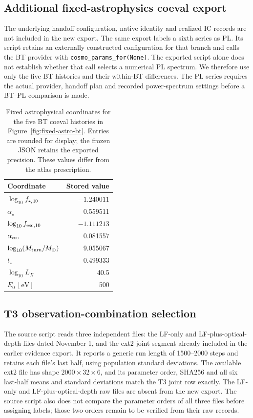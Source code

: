 \subsection{Additional fixed-astrophysics coeval export}\label{app:fixed-astro-update}

The underlying handoff configuration, native identity and realized IC records are not included in the new export. The same export labels a sixth series as PL. Its script retains an externally constructed configuration for that branch and calls the BT provider with \texttt{cosmo\_params\_for(None)}. The exported script alone does not establish whether that call selects a numerical PL spectrum. We therefore use only the five BT histories and their within-BT differences. The PL series requires the actual provider, handoff plan and recorded power-spectrum settings before a BT--PL comparison is made.

\begin{table}[t]\centering\small
\caption{Fixed astrophysical coordinates for the five BT coeval histories in Figure~\ref{fig:fixed-astro-bt}. Entries are rounded for display; the frozen JSON retains the exported precision. These values differ from the atlas prescription.}\label{tab:fixed-astro-update}
\begin{tabular}{lr}\toprule
Coordinate & Stored value\\\midrule
$\log_{10}f_{\star,10}$ & $-1.240011$\\
$\alpha_\star$ & 0.559511\\
$\log_{10}f_{{\rm esc},10}$ & $-1.111213$\\
$\alpha_{\rm esc}$ & 0.081557\\
$\log_{10}(M_{\rm turn}/M_\odot)$ & 9.055067\\
$t_\star$ & 0.499333\\
$\log_{10}L_X$ & 40.5\\
$E_0\ [\mathrm{eV}]$ & 500\\\bottomrule
\end{tabular}\end{table}

\subsection{T3 observation-combination selection}\label{app:t3-selection}

The source script reads three independent files: the LF-only and LF-plus-optical-depth files dated November 1, and the ext2 joint segment already included in the earlier evidence export. It reports a generic run length of 1500--2000 steps and retains each file's last half, using population standard deviations. The available ext2 file has shape $2000\times32\times6$, and its parameter order, SHA256 and all six last-half means and standard deviations match the T3 joint row exactly. The LF-only and LF-plus-optical-depth raw files are absent from the new export. The source script also does not compare the parameter orders of all three files before assigning labels; those two orders remain to be verified from their raw records.

